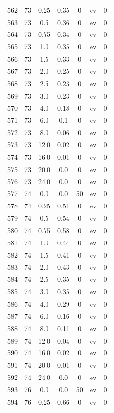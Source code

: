 \documentclass[12pt,a4paper]{article}
\begin{document}
\begin{tabular}{r|cccccc}
	562 & 73 & 0.25 & 0.35 & 0 & ev & 0 \\
	563 & 73 & 0.5 & 0.36 & 0 & ev & 0 \\
	564 & 73 & 0.75 & 0.34 & 0 & ev & 0 \\
	565 & 73 & 1.0 & 0.35 & 0 & ev & 0 \\
	566 & 73 & 1.5 & 0.33 & 0 & ev & 0 \\
	567 & 73 & 2.0 & 0.25 & 0 & ev & 0 \\
	568 & 73 & 2.5 & 0.23 & 0 & ev & 0 \\
	569 & 73 & 3.0 & 0.23 & 0 & ev & 0 \\
	570 & 73 & 4.0 & 0.18 & 0 & ev & 0 \\
	571 & 73 & 6.0 & 0.1 & 0 & ev & 0 \\
	572 & 73 & 8.0 & 0.06 & 0 & ev & 0 \\
	573 & 73 & 12.0 & 0.02 & 0 & ev & 0 \\
	574 & 73 & 16.0 & 0.01 & 0 & ev & 0 \\
	575 & 73 & 20.0 & 0.0 & 0 & ev & 0 \\
	576 & 73 & 24.0 & 0.0 & 0 & ev & 0 \\
	577 & 74 & 0.0 & 0.0 & 50 & ev & 0 \\
	578 & 74 & 0.25 & 0.51 & 0 & ev & 0 \\
	579 & 74 & 0.5 & 0.54 & 0 & ev & 0 \\
	580 & 74 & 0.75 & 0.58 & 0 & ev & 0 \\
	581 & 74 & 1.0 & 0.44 & 0 & ev & 0 \\
	582 & 74 & 1.5 & 0.41 & 0 & ev & 0 \\
	583 & 74 & 2.0 & 0.43 & 0 & ev & 0 \\
	584 & 74 & 2.5 & 0.35 & 0 & ev & 0 \\
	585 & 74 & 3.0 & 0.35 & 0 & ev & 0 \\
	586 & 74 & 4.0 & 0.29 & 0 & ev & 0 \\
	587 & 74 & 6.0 & 0.16 & 0 & ev & 0 \\
	588 & 74 & 8.0 & 0.11 & 0 & ev & 0 \\
	589 & 74 & 12.0 & 0.04 & 0 & ev & 0 \\
	590 & 74 & 16.0 & 0.02 & 0 & ev & 0 \\
	591 & 74 & 20.0 & 0.01 & 0 & ev & 0 \\
	592 & 74 & 24.0 & 0.0 & 0 & ev & 0 \\
	593 & 76 & 0.0 & 0.0 & 50 & ev & 0 \\
	594 & 76 & 0.25 & 0.66 & 0 & ev & 0 \\

\end{tabular}
\end{document}
